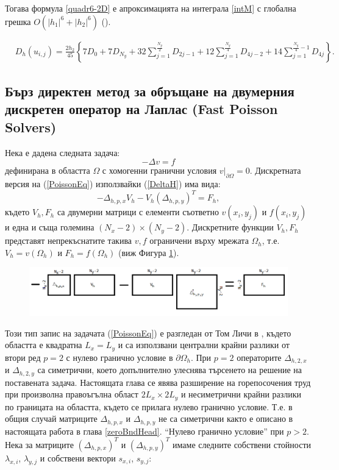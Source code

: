 \documentclass{article}
\newcommand{\be}{\begin{equation}}
\newcommand{\ee}{\end{equation}}
\newcommand{\rf}[1]{(\ref{#1})}
\theoremstyle{remark}
\begin{document}
Тогава формула \eqref{quadr6-2D} е апроксимацията на интеграла \eqref{intM} с глобална грешка $O(|h_1|^6+|h_2|^6)$ (\cite{boole}).

\begin{align}\label{quadr6-2D}
&D_h(u_{i,j})  =
\frac{2h_2}{45} 
\left\{
7D_{0}+7D_{N_y}+32 \sum_{j=1}^{\frac{N_y}{2}}D_{2j-1}
+12\sum_{j=1}^{\frac{N_y}{4}}D_{4j-2}
+14 \sum_{j=1}^{\frac{N_y}{4}-1}D_{4j}
\right\}.
\end{align}

\subsection{Бърз директен метод за обръщане на двумерния дискретен оператор на Лаплас (Fast Poisson Solvers) }\label{FPS}
Нека е дадена следната задача:
\be\label{PoissonEq}
-\Delta v = f
\ee
дефинирана в областта $\Omega$ с хомогенни гранични условия $v \big|_{\partial\Omega} = 0$. Дискретната версия на \rf{PoissonEq} използвайки \rf{DeltaH} има вида:
\be\label{PsnDiscret}
-\Delta_{h,p,x}  V_h - V_h (\Delta_{h,p,y})^T = F_h,
\ee
където $V_h, F_h$ са двумерни матрици с елементи съответно $v(x_i,y_j)$ и  $f(x_i,y_j)$ и една и съща големина $(N_x-2)\times(N_y-2)$. Дискретните функции $V_h, F_h$ представят непрекъснатите такива $v, f$ ограничени върху мрежата $\Omega_h$, т.е. $V_h = v(\Omega_h)$ и $F_h = f(\Omega_h)$ (виж Фигура \ref{fig:FPSexplained}).
\begin{figure}[ht]
     \includegraphics[width=\linewidth]{FPSExplained.png}
	\caption{}
	\label{fig:FPSexplained}
\end{figure}
\FloatBarrier
Този тип запис на задачата \rf{PoissonEq} е разгледан от Том Личи в \cite{ref34}, където областта е квадратна $L_x = L_y$ и са използвани централни крайни разлики от втори ред $p=2$ с нулево гранично условие в $\partial \Omega_h$. При $p=2$ операторите $\Delta_{h,2,x}$ и $\Delta_{h,2,y}$ са симетрични, което допълнително улеснява търсенето на решение на поставената задача. Настоящата глава се явява разширение на горепосочения труд при произволна правоъгълна област $2L_x \times 2L_y$ и несиметрични крайни разлики по границата на областта, където се прилага нулево гранично условие. Т.е. в общия случай матриците $\Delta_{h,p,x}$ и $\Delta_{h,p,y}$ не са симетрични както е описано в настоящата работа в глава \ref{zeroBndHead}. ``Нулево гранично условие'' при $p>2$. Нека за матриците $(\Delta_{h,p,x})^T$ и $(\Delta_{h,p,y})^T$ имаме следните собствени стойности $\lambda_{x,i}$, $\lambda_{y,j}$ и собствени вектори $s_{x,i}$, $s_{y,j}$:
\end{document}
